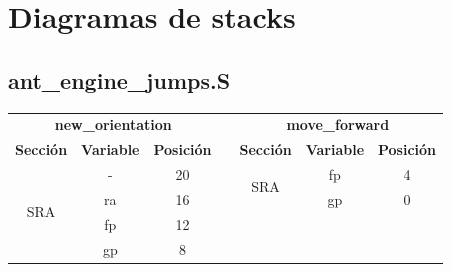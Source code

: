 \documentclass[a4paper, 10pt, twoside, notitlepage]{article}
\begin{document}
\newpage
\normalsize
\section{Diagramas de stacks}\label{sec:diagstacks}

\subsection{ant\_engine\_jumps.S}

\begin{table}[htp]
\centering
\begin{tabular}{cccllll}
\multicolumn{3}{c}{\textbf{new\_orientation}}                                                                                &                       & \multicolumn{3}{c}{\textbf{move\_forward}}                                                                                  \\ \cline{1-3} \cline{5-7} 
\multicolumn{1}{|l|}{\textbf{Sección}}     & \multicolumn{1}{c|}{\textbf{Variable}} & \multicolumn{1}{c|}{\textbf{Posición}} & \multicolumn{1}{l|}{} & \multicolumn{1}{c|}{\textbf{Sección}}     & \multicolumn{1}{c|}{\textbf{Variable}} & \multicolumn{1}{c|}{\textbf{Posición}} \\ \cline{1-3} \cline{5-7} 
\multicolumn{1}{|c|}{\multirow{4}{*}{SRA}} & \multicolumn{1}{c|}{-}                 & \multicolumn{1}{c|}{20}                & \multicolumn{1}{l|}{} & \multicolumn{1}{c|}{\multirow{2}{*}{SRA}} & \multicolumn{1}{c|}{fp}                & \multicolumn{1}{c|}{4}                 \\ \cline{2-3} \cline{6-7} 
\multicolumn{1}{|c|}{}                     & \multicolumn{1}{c|}{ra}                & \multicolumn{1}{c|}{16}                & \multicolumn{1}{l|}{} & \multicolumn{1}{c|}{}                     & \multicolumn{1}{c|}{gp}                & \multicolumn{1}{c|}{0}                 \\ \cline{2-3} \cline{5-7} 
\multicolumn{1}{|c|}{}                     & \multicolumn{1}{c|}{fp}                & \multicolumn{1}{c|}{12}                &                       &                                           &                                        &                                        \\ \cline{2-3}
\multicolumn{1}{|c|}{}                     & \multicolumn{1}{c|}{gp}                & \multicolumn{1}{c|}{8}                 &                       &                                           &                                        &                                        \\ \cline{1-3}

\end{tabular}
\end{table}
\end{document}
